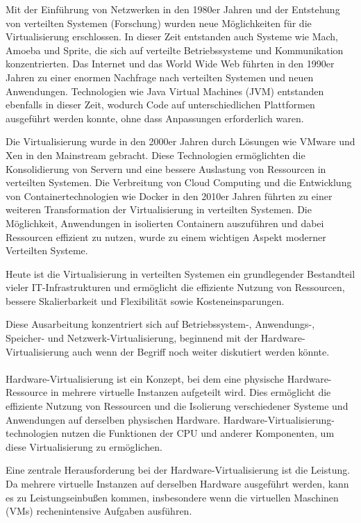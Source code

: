 Mit der Einführung von Netzwerken in den 1980er Jahren und der Entstehung von verteilten Systemen (Forschung) wurden neue Möglichkeiten für die Virtualisierung erschlossen. In dieser Zeit entstanden auch Systeme wie Mach, Amoeba und Sprite, die sich auf verteilte Betriebssysteme und Kommunikation konzentrierten. Das Internet und das World Wide Web führten in den 1990er Jahren zu einer enormen Nachfrage nach verteilten Systemen und neuen Anwendungen. Technologien wie Java Virtual Machines (JVM) entstanden ebenfalls in dieser Zeit, wodurch Code auf unterschiedlichen Plattformen ausgeführt werden konnte, ohne dass Anpassungen erforderlich waren.

Die Virtualisierung wurde in den 2000er Jahren durch Lösungen wie VMware und Xen in den Mainstream gebracht. Diese Technologien ermöglichten die Konsolidierung von Servern und eine bessere Auslastung von Ressourcen in verteilten Systemen. Die Verbreitung von Cloud Computing und die Entwicklung von Containertechnologien wie Docker in den 2010er Jahren führten zu einer weiteren Transformation der Virtualisierung in verteilten Systemen. Die Möglichkeit, Anwendungen in isolierten Containern auszuführen und dabei Ressourcen effizient zu nutzen, wurde zu einem wichtigen Aspekt moderner Verteilten Systeme.

Heute ist die Virtualisierung in verteilten Systemen ein grundlegender Bestandteil vieler IT-Infrastrukturen und ermöglicht die effiziente Nutzung von Ressourcen, bessere Skalierbarkeit und Flexibilität sowie Kosteneinsparungen.

Diese Ausarbeitung konzentriert sich auf Betriebssystem-, Anwendungs-, Speicher- und Netzwerk-Virtualisierung, beginnend mit der Hardware-Virtualisierung auch wenn der Begriff noch weiter diskutiert werden könnte. 
\\\\
Hardware-Virtualisierung ist ein Konzept, bei dem eine physische Hardware-Ressource in mehrere virtuelle Instanzen aufgeteilt wird. Dies ermöglicht die effiziente Nutzung von Ressourcen und die Isolierung verschiedener Systeme und Anwendungen auf derselben physischen Hardware. Hardware-Virtualisierung-technologien nutzen die Funktionen der CPU und anderer Komponenten, um diese Virtualisierung zu ermöglichen.

Eine zentrale Herausforderung bei der Hardware-Virtualisierung ist die Leistung. Da mehrere virtuelle Instanzen auf derselben Hardware ausgeführt werden, kann es zu Leistungseinbußen kommen, insbesondere wenn die virtuellen Maschinen (VMs) rechenintensive Aufgaben ausführen.

